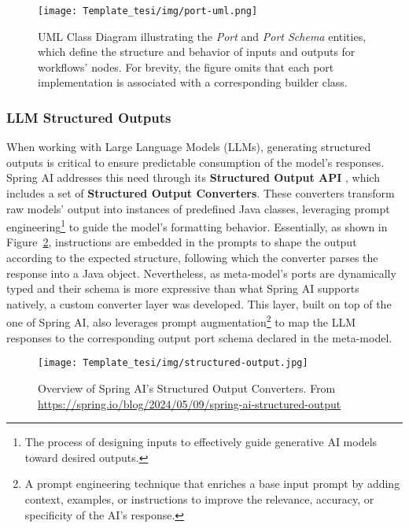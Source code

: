 \begin{figure}[h]
    \centering
    \texttt{[image: Template\_tesi/img/port-uml.png]} 
    \caption{UML Class Diagram illustrating the \textit{Port} and \textit{Port Schema} entities, which define the structure and behavior of inputs and outputs for workflows' nodes. For brevity, the figure omits that each port implementation is associated with a corresponding builder class.
}
    \label{fig:port} 
\end{figure}



\subsubsection{LLM Structured Outputs}

When working with Large Language Models (LLMs), generating structured outputs is critical to ensure predictable consumption of the model’s responses. Spring AI addresses this need through its \textbf{Structured Output API} \cite{tzolov2024structured}, which includes a set of \textbf{Structured Output Converters}. These converters transform raw models' output into instances of predefined Java classes, leveraging prompt engineering\footnote{The process of designing inputs to effectively guide generative AI models toward desired outputs.} to guide the model's formatting behavior. Essentially, as shown in Figure~\ref{fig:structured-output-spring}, instructions are embedded in the prompts to shape the output according to the expected structure, following which the converter parses the response into a Java object.
Nevertheless, as meta-model's ports are dynamically typed and their schema is more expressive than what Spring AI supports natively, a custom converter layer was developed. This layer, built on top of the one of Spring AI,  also leverages prompt augmentation\footnote{A prompt engineering technique that enriches a base input prompt by adding context, examples, or instructions to improve the relevance, accuracy, or specificity of the AI's response.} to map the LLM responses to the corresponding output port schema declared in the meta-model.

\begin{figure}[H]
    \centering
    \texttt{[image: Template\_tesi/img/structured-output.jpg]}
    \caption{Overview of Spring AI's Structured Output Converters. From \url{https://spring.io/blog/2024/05/09/spring-ai-structured-output}}
    \label{fig:structured-output-spring} 
\end{figure}




